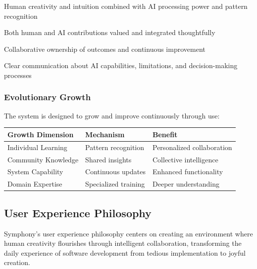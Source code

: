 \begin{description}[leftmargin=4cm,labelwidth=3.5cm]
    \item[\textbf{Complementary Strengths}] Human creativity and intuition combined with AI processing power and pattern recognition
    
    \item[\textbf{Mutual Respect}] Both human and AI contributions valued and integrated thoughtfully
    
    \item[\textbf{Shared Responsibility}] Collaborative ownership of outcomes and continuous improvement
    
    \item[\textbf{Transparent Interaction}] Clear communication about AI capabilities, limitations, and decision-making processes
\end{description}

\subsubsection{Evolutionary Growth}

The system is designed to grow and improve continuously through use:

\begin{center}
\begin{tabular}{@{}lll@{}}
\toprule
\textbf{Growth Dimension} & \textbf{Mechanism} & \textbf{Benefit} \\
\midrule
Individual Learning & Pattern recognition & Personalized collaboration \\
Community Knowledge & Shared insights & Collective intelligence \\
System Capability & Continuous updates & Enhanced functionality \\
Domain Expertise & Specialized training & Deeper understanding \\
\bottomrule
\end{tabular}
\label{tab:growth-framework}
\end{center}

\subsection{User Experience Philosophy}
\label{subsec:user-experience-philosophy}

Symphony's user experience philosophy centers on creating an environment where human creativity flourishes through intelligent collaboration, transforming the daily experience of software development from tedious implementation to joyful creation.

